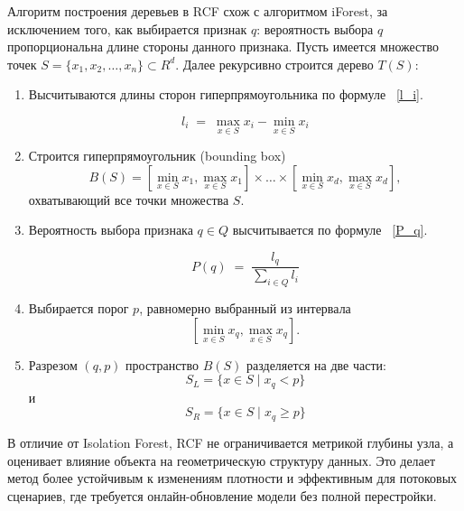 Алгоритм построения деревьев в RCF схож с алгоритмом iForest, за исключением того, как выбирается признак \(q\): вероятность выбора \(q\) пропорциональна длине стороны данного признака. Пусть имеется множество точек \(S = \{x_1, x_2, \dots, x_n\} \subset R^d\). Далее рекурсивно строится дерево \(T(S)\):
\begin{enumerate}
    \item Высчитываются длины сторон гиперпрямоугольника по формуле ~\ref{l_i}.

\begin{equation}\label{l_i}
    l_i \;=\; \max_{x \in S} x_i - \min_{x \in S} x_i
\end{equation}

    \item Строится гиперпрямоугольник (bounding box) $$B(S) = [\min_{x \in S} x_1, \max_{x \in S} x_1] \times  \dots \times [\min_{x \in S} x_d, \max_{x \in S} x_d],$$ охватывающий все точки множества \(S\).
    \item Вероятность выбора признака \(q \in Q\) высчитывается по формуле ~\ref{P_q}.  

\begin{equation}\label{P_q}
    P(q) \;=\; \frac{l_q}{\sum_{i \in Q} l_i}
\end{equation}

    \item Выбирается порог \(p\), равномерно выбранный из интервала $$[\min_{x \in S} x_q, \max_{x \in S} x_q].$$
    \item Разрезом \((q,p)\) пространство \(B(S)\) разделяется на две части: $$S_L = \{ x\in S \mid x_q < p \}$$ и $$S_R = \{ x\in S \mid x_q \ge p \}$$
\end{enumerate}

В отличие от Isolation Forest, RCF не ограничивается метрикой глубины узла, а оценивает влияние объекта на геометрическую структуру данных. Это делает метод более устойчивым к изменениям плотности и эффективным для потоковых сценариев, где требуется онлайн-обновление модели без полной перестройки.